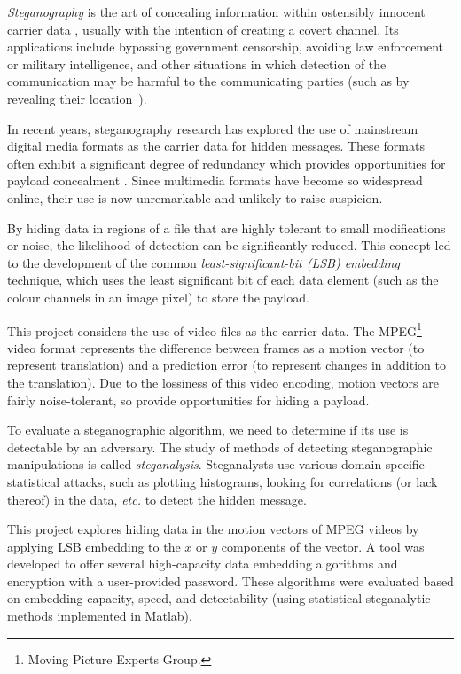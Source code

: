 \documentclass[12pt,british,twoside,notitlepage,usenames,dvipsnames,hypens,final]{report}
\numberwithin{equation}{section}
\numberwithin{figure}{section}
\begin{document}
\emph{Steganography} is the art of concealing information within ostensibly innocent carrier data \cite[p.~3]{fridrich}, usually with the intention of creating a covert channel. Its applications include bypassing government censorship, avoiding law enforcement or military intelligence, and other situations in which detection of the communication may be harmful to the communicating parties (such as by revealing their location~\cite{infohiding-survey}). 

In recent years, steganography research has explored the use of mainstream digital media formats as the carrier data for hidden messages. These formats often exhibit a significant degree of redundancy which provides opportunities for payload concealment \cite[p.~2]{fridrich}. Since multimedia formats have become so widespread online, their use is now unremarkable and unlikely to raise suspicion.

By hiding data in regions of a file that are highly tolerant to small modifications or noise, the likelihood of detection can be significantly reduced. This concept led to the development of the common \emph{least-significant-bit (LSB) embedding}~\cite{bateman}\label{lsb-steg} technique, which uses the least significant bit of each data element (such as the colour channels in an image pixel) to store the payload.

This project considers the use of video files as the carrier data. The MPEG\footnote{Moving Picture Experts Group.} video format represents the difference between frames as a motion vector (to represent translation) and a prediction error (to represent changes in addition to the translation). Due to the lossiness of this video encoding, motion vectors are fairly noise-tolerant, so provide opportunities for hiding a payload.


To evaluate a steganographic algorithm, we need to determine if its use is detectable by an adversary. The study of methods of detecting steganographic manipulations is called \emph{steganalysis}. Steganalysts use various domain-specific statistical attacks, such as plotting histograms, looking for correlations (or lack thereof) in the data, \emph{etc.} to detect the hidden message.

This project explores hiding data in the motion vectors of MPEG videos by applying LSB embedding to the $x$ or $y$ components of the vector. A tool was developed to offer several high-capacity data embedding algorithms and encryption with a user-provided password. These algorithms were evaluated based on embedding capacity, speed, and detectability (using statistical steganalytic methods implemented in Matlab).
\end{document}

